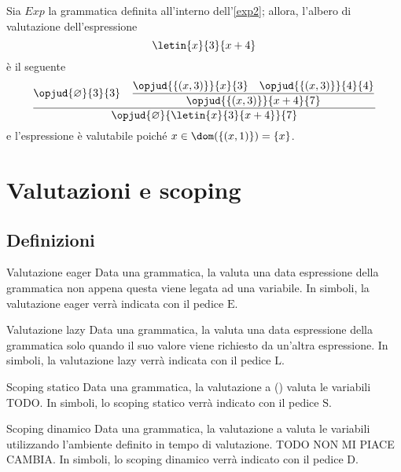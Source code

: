 \documentclass[a4paper, 12pt]{report}
\begin{document}
    \begin{example}
        Sia $Exp$ la grammatica definita all'interno dell'\cref{exp2}; allora, l'albero di valutazione dell'espressione $$\letin{x}{3}{x + 4}$$ è il seguente $$\dfrac{\opjud{\varnothing}{3}{3} \quad \dfrac{\opjud{\{(x, 3)\}}{x}{3} \quad \opjud{\{(x,3)\}}{4}{4}}{\opjud{\{(x, 3)\}}{x +4}{7}}}{\opjud{\varnothing}{\letin{x}{3}{x +4}}{7}}$$ e l'espressione è valutabile poiché $x \in \dom(\{(x,1)\}) = \{x\}$.
    \end{example}

    \section{Valutazioni e scoping}

    \subsection{Definizioni}

    \begin{frameddefn}{Valutazione eager}
        Data una grammatica, la  valuta una data espressione della grammatica non appena questa viene legata ad una variabile. In simboli, la valutazione eager verrà indicata con il pedice $\mathrm{E}$.
    \end{frameddefn}

    \begin{frameddefn}{Valutazione lazy}
        Data una grammatica, la  valuta una data espressione della grammatica solo quando il suo valore viene richiesto da un'altra espressione. In simboli, la valutazione lazy verrà indicata con il pedice $\mathrm{L}$.
    \end{frameddefn}

    \begin{frameddefn}{Scoping statico}
        Data una grammatica, la valutazione a  () valuta le variabili TODO. In simboli, lo scoping statico verrà indicato con il pedice $\mathrm{S}$.
    \end{frameddefn}

    \begin{frameddefn}{Scoping dinamico}
        Data una grammatica, la valutazione a  valuta le variabili utilizzando l'ambiente definito in tempo di valutazione. TODO NON MI PIACE CAMBIA. In simboli, lo scoping dinamico verrà indicato con il pedice $\mathrm{D}$.
    \end{frameddefn}
\end{document}
